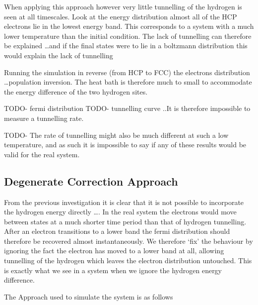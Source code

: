 When applying this approach however very
little tunnelling of the hydrogen is seen at all timescales.
Look at the energy distribution almost all
of the HCP electrons lie in the lowest energy band.
This corresponds to a system with a much lower
temperature than the initial condition.
The lack of tunnelling can therefore be explained
\ldots and if
the final states were to lie in a boltzmann  distribution
this would explain the lack of tunnelling

Running the simulation
in reverse (from HCP to FCC) the electrons
distribution \ldots population inversion.
The heat bath is therefore much to small
to accommodate the energy difference of
the two hydrogen sites.

TODO- fermi distribution
TODO- tunnelling curve
..It is therefore impossible to measure a tunnelling
rate.

TODO- The rate of tunnelling might also
be much different at such a low temperature,
and as such it is impossible to say if
any of these results would be valid
for the real system.

\subsection{Degenerate Correction Approach}
From the previous investigation it is clear
that it is not possible to incorporate the
hydrogen energy directly \ldots. In the
real system the electrons would move
between states at a much shorter time
period than that of hydrogen tunnelling.
After an electron transitions to a lower
band the fermi distribution should therefore
be recovered almost instantaneously. We
therefore `fix' the behaviour by
ignoring the fact the electron
has moved to a lower band at all,
allowing tunnelling of the hydrogen
which leaves the electron distribution
untouched. This is exactly what
we see in a system when we ignore
the hydrogen energy difference.


The Approach used to simulate the system is as follows